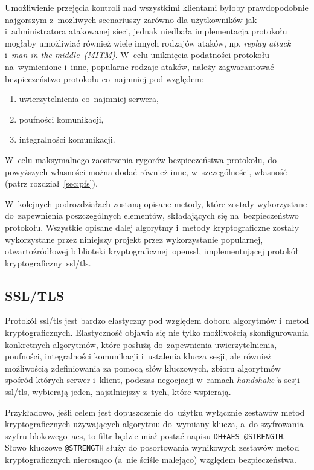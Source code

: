 \documentclass[thesis]{subfiles}
\begin{document}
Umożliwienie przejęcia kontroli nad wszystkimi klientami byłoby prawdopodobnie najgorszym z~możliwych scenariuszy zarówno dla użytkowników jak i~administratora atakowanej sieci, jednak niedbała implementacja protokołu mogłaby umożliwiać również wiele innych rodzajów ataków, np. \emph{replay attack} i~\emph{man in the middle~(MITM)}. W~celu uniknięcia podatności protokołu na~wymienione i~inne, popularne rodzaje ataków, należy zagwarantować bezpieczeństwo protokołu co~najmniej pod względem:
\begin{enumerate}
\item uwierzytelnienia co~najmniej serwera,
\item poufności komunikacji,
\item integralności komunikacji.
\end{enumerate}
W~celu maksymalnego zaostrzenia rygorów bezpieczeństwa protokołu, do powyższych własności można dodać również inne, w~szczególności, własność \emph{} (patrz rozdział~\ref{sec:pfs}).

W~kolejnych podrozdziałach zostaną opisane metody, które zostały wykorzystane do~zapewnienia poszczególnych elementów, składających się na~bezpieczeństwo protokołu. Wszystkie opisane dalej algorytmy i~metody kryptograficzne zostały wykorzystane przez niniejszy projekt przez wykorzystanie popularnej, otwartoźródłowej biblioteki kryptograficznej~\gls{openssl}, implementującej protokół kryptograficzny~\gls{ssl/tls}.


\subsection{SSL/TLS}
\label{sec:ssl-tls}

Protokół \gls{ssl/tls} jest bardzo elastyczny pod względem doboru algorytmów i~metod kryptograficznych. Elastyczność objawia się nie tylko możliwością skonfigurowania konkretnych algorytmów, które posłużą do~zapewnienia uwierzytelnienia, poufności, integralności komunikacji i~ustalenia klucza sesji, ale również możliwością zdefiniowania za pomocą słów kluczowych, zbioru algorytmów spośród których serwer i~klient, podczas negocjacji w~ramach \emph{handshake'u} sesji \gls{ssl/tls}, wybierają jeden, najsilniejszy z~tych, które wspierają.

Przykładowo, jeśli celem jest dopuszczenie do~użytku wyłącznie zestawów metod kryptograficznych używających algorytmu  do~wymiany klucza, a~do szyfrowania szyfru blokowego~\gls{aes}, to filtr będzie miał postać napisu \texttt{DH+AES @STRENGTH}. Słowo kluczowe \texttt{@STRENGTH} służy do posortowania wynikowych zestawów metod kryptograficznych nierosnąco (a~nie ściśle malejąco) względem bezpieczeństwa.
\end{document}
